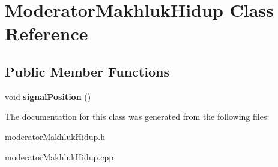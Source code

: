 \hypertarget{class_moderator_makhluk_hidup}{}\section{Moderator\+Makhluk\+Hidup Class Reference}
\label{class_moderator_makhluk_hidup}
\subsection*{Public Member Functions}
\begin{DoxyCompactItemize}
\item 
void {\bfseries signal\+Position} ()\hypertarget{class_moderator_makhluk_hidup_ab230361c7f172ca30d8304cc5bf80ebf}{}\label{class_moderator_makhluk_hidup_ab230361c7f172ca30d8304cc5bf80ebf}

\end{DoxyCompactItemize}


The documentation for this class was generated from the following files\+:\begin{DoxyCompactItemize}
\item 
moderator\+Makhluk\+Hidup.\+h\item 
moderator\+Makhluk\+Hidup.\+cpp\end{DoxyCompactItemize}
